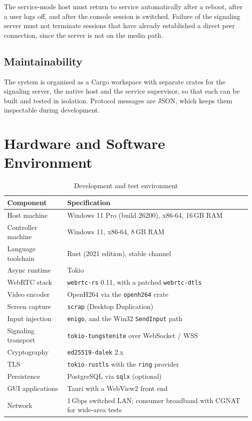 The service-mode host must return to service automatically after a reboot,
after a user logs off, and after the console session is switched. Failure of the
signaling server must not terminate sessions that have already established a
direct peer connection, since the server is not on the media path.

\subsection{Maintainability}

The system is organised as a Cargo workspace with separate crates for the
signaling server, the native host and the service supervisor, so that each can
be built and tested in isolation. Protocol messages are JSON, which keeps them
inspectable during development.

\section{Hardware and Software Environment}

\begin{table}[H]
\centering
\caption{Development and test environment}
\label{tab:env}
\small
\begin{tabular}{@{}p{4.2cm}p{9cm}@{}}
\toprule
\textbf{Component} & \textbf{Specification} \\
\midrule
Host machine        & Windows 11 Pro (build 26200), x86-64, 16\,GB RAM \\
Controller machine  & Windows 11, x86-64, 8\,GB RAM \\
Language toolchain  & Rust (2021 edition), stable channel \\
Async runtime       & Tokio \\
WebRTC stack        & \texttt{webrtc-rs} 0.11, with a patched \texttt{webrtc-dtls} \\
Video encoder       & OpenH264 via the \texttt{openh264} crate \\
Screen capture      & \texttt{scrap} (Desktop Duplication) \\
Input injection     & \texttt{enigo}, and the Win32 \texttt{SendInput} path \\
Signaling transport & \texttt{tokio-tungstenite} over WebSocket / WSS \\
Cryptography        & \texttt{ed25519-dalek} 2.x \\
TLS                 & \texttt{tokio-rustls} with the \texttt{ring} provider \\
Persistence         & PostgreSQL via \texttt{sqlx} (optional) \\
GUI applications    & Tauri with a WebView2 front end \\
Network             & 1\,Gbps switched LAN; consumer broadband with CGNAT for wide-area tests \\
\bottomrule
\end{tabular}
\end{table}

